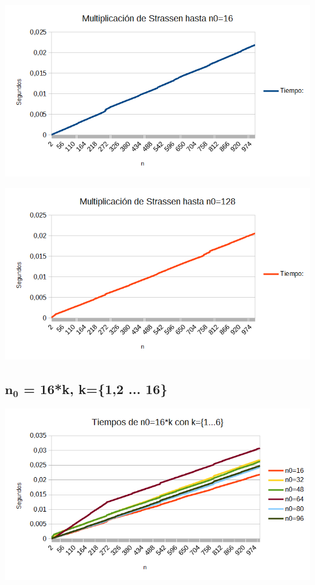 \documentclass[12pt,letterpaper]{scrartcl}
\begin{document}
\includegraphics[scale=0.6]{n0-16.png} 

\includegraphics[scale=0.6]{n0-128.png} 

\subsection{$\mathbf{n_0}$ = 16*k, k=\{1,2 ... 16\}}

\includegraphics[scale=0.6]{1-6.png} 
\end{document}
